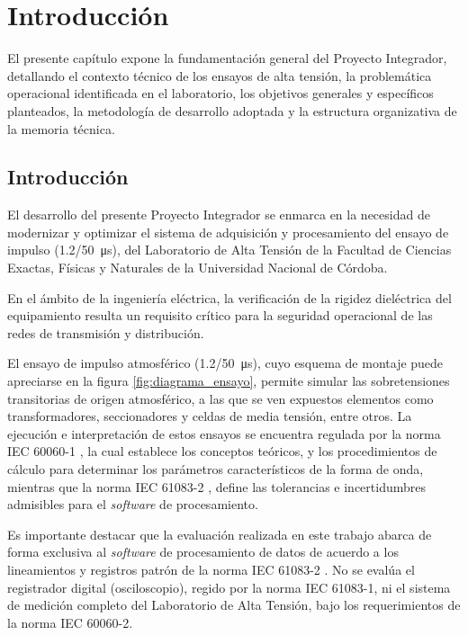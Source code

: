 \newpage
\chapter{Introducción}
\label{ch:introduccion}
\vspace{3\baselineskip}

El presente capítulo expone la fundamentación general del Proyecto Integrador, detallando el contexto técnico de los ensayos de alta tensión, la problemática operacional identificada en el laboratorio, los objetivos generales y específicos planteados, la metodología de desarrollo adoptada y la estructura organizativa de la memoria técnica.

\section{Introducción}
\label{sec:introduccion_gral}
\vspace{3\baselineskip}

El desarrollo del presente Proyecto Integrador se enmarca en la necesidad de modernizar y optimizar el sistema de adquisición y procesamiento del ensayo de impulso (\qty[parse-numbers=false]{1.2/50}{\micro\second}), del Laboratorio de Alta Tensión de la Facultad de Ciencias Exactas, Físicas y Naturales de la Universidad Nacional de Córdoba.

En el ámbito de la ingeniería eléctrica, la verificación de la rigidez dieléctrica del equipamiento resulta un requisito crítico para la seguridad operacional de las redes de transmisión y distribución.

El ensayo de impulso atmosférico (\qty[parse-numbers=false]{1.2/50}{\micro\second}), cuyo esquema de montaje puede apreciarse en la figura \ref{fig:diagrama_ensayo}, permite simular las sobretensiones transitorias de origen atmosférico, a las que se ven expuestos elementos como transformadores, seccionadores y celdas de media tensión, entre otros. La ejecución e interpretación de estos ensayos se encuentra regulada por la norma IEC 60060-1 \cite{iec60060_1}, la cual establece los conceptos teóricos, y los procedimientos de cálculo para determinar los parámetros característicos de la forma de onda, mientras que la norma IEC 61083-2 \cite{iec61083_2}, define las tolerancias e incertidumbres admisibles para el \emph{software} de procesamiento.

Es importante destacar que la evaluación realizada en este trabajo abarca de forma exclusiva al \emph{software} de procesamiento de datos de acuerdo a los lineamientos y registros patrón de la norma IEC 61083-2 \cite{iec61083_2}. No se evalúa el registrador digital (osciloscopio), regido por la norma IEC 61083-1, ni el sistema de medición completo del Laboratorio de Alta Tensión, bajo los requerimientos de la norma IEC 60060-2.

